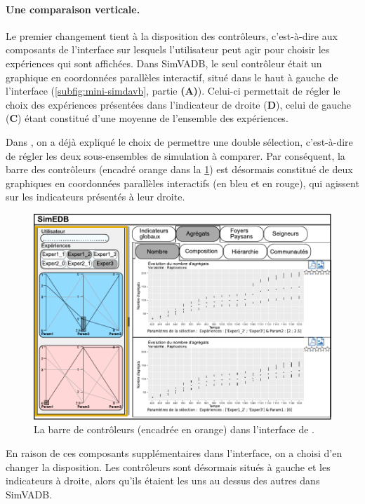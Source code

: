 \paragraph{Une comparaison verticale.}

Le premier changement tient à la disposition des \og contrôleurs\fg{}, c'est-à-dire aux composants de l'interface sur lesquels l'utilisateur peut agir pour choisir les expériences qui sont affichées.
Dans SimVADB, le seul contrôleur était un graphique en coordonnées parallèles interactif, situé dans le haut à gauche de l'interface (\cref{subfig:mini-simdavb}, partie \textbf{(A)}).
Celui-ci permettait de régler le choix des expériences présentées dans l'indicateur de droite (\textbf{D}), celui de gauche (\textbf{C}) étant constitué d'une moyenne de l'ensemble des expériences.

Dans \simedb{}, on a déjà expliqué le choix de permettre une double sélection, c'est-à-dire de régler les deux sous-ensembles de simulation à comparer.
Par conséquent, la barre des contrôleurs (encadré orange dans la \cref{fig:simedb-sidebar}) est désormais constitué de deux graphiques en coordonnées parallèles interactifs (en bleu et en rouge), qui agissent sur les indicateurs présentés à leur droite.

\begin{figure}[H]
	\centering
	\includegraphics[width=\linewidth]{img/mockup_SimEDB_controleurs.pdf}
	\caption[La barre de contrôleurs dans l'interface de \simedb{}.]{La barre de contrôleurs (encadrée en orange) dans l'interface de \simedb{}.}
	\label{fig:simedb-sidebar}
\end{figure}

En raison de ces composants supplémentaires dans l'interface, on a choisi d'en changer la disposition.
Les contrôleurs sont désormais situés à gauche et les indicateurs à droite, alors qu'ils étaient les uns au dessus des autres dans SimVADB.

